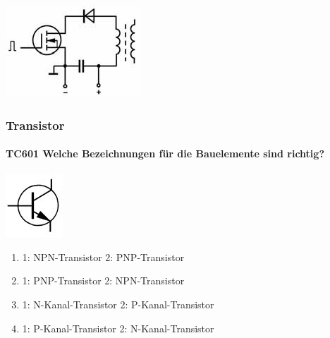 \documentclass[8pt]{article}
\begin{document}
\begin{enumerate}
\begin{enumerate}[nolistsep,label=\Alph*]
{\begin{enumerate}[nolistsep,label=\Alph*]
\begin{enumerate}[nolistsep,label=\Alph*]
\begin{center}
\begin{minipage}{\linewidth}
			\centering
			\includegraphics[scale=1.0]{pics/tc528_d.jpg}
		\end{minipage}
	\end{center}
\end{enumerate}

\pagebreak
\subsubsection{Transistor}
\paragraph*{TC601 Welche Bezeichnungen für die Bauelemente sind richtig?}
\begin{center}
	\begin{minipage}{\linewidth}
		\centering
		\includegraphics[scale=1.0]{pics/tc601_a.jpg}
	\end{minipage}
\end{center}
\begin{enumerate}[nolistsep,label=\Alph*]
\item 1: NPN-Transistor 2: PNP-Transistor
\item 1: PNP-Transistor 2: NPN-Transistor
\item 1: N-Kanal-Transistor 2: P-Kanal-Transistor
\item 1: P-Kanal-Transistor 2: N-Kanal-Transistor
\end{enumerate}


\end{enumerate}}
\end{enumerate}
\end{enumerate}
\end{document}
